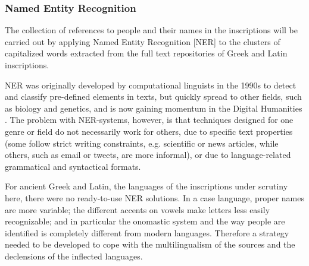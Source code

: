 \documentclass[amsthm,ebook]{saparticle}
\begin{document}
\subsubsection{Named Entity Recognition}


\noindent The collection of references to people and their names in the inscriptions will be carried out by applying Named Entity
Recognition [NER] to the clusters of capitalized words extracted from the full text repositories of Greek and Latin
inscriptions.

NER was originally developed by computational linguists in the 1990s to detect and classify pre-defined elements in
texts, but quickly spread to other fields, such as biology and genetics, and is now gaining momentum in the Digital
Humanities \citep{vanHooland}. The problem with NER-systems, however, is that techniques designed for one
genre or field do not necessarily work for others, due to specific text properties (some follow strict writing
constraints, e.g. scientific or news articles, while others, such as email or tweets, are more informal), or due to
language-related grammatical and syntactical formats.

For ancient Greek and Latin, the languages of the inscriptions under scrutiny here, there were no ready-to-use NER
solutions. In a case language, proper names are more variable; the different accents on vowels make letters less easily
recognizable; and in particular the onomastic system and the way people are identified is completely different from
modern languages. Therefore a strategy needed to be developed to cope with the multilingualism of the sources and the
declensions of the inflected languages. 
\end{document}
